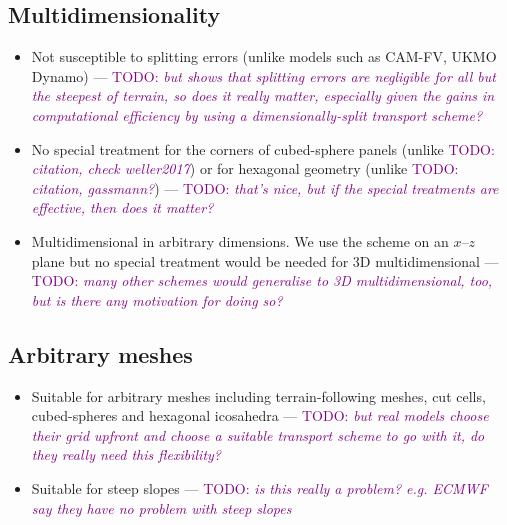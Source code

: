 \documentclass{article}
\newcommand{\TODO}[1]{\textcolor{purple}{TODO: \emph{#1}}}
\begin{document}
\subsection*{Multidimensionality}
\begin{itemize}
	\item Not susceptible to splitting errors (unlike models such as CAM-FV, UKMO Dynamo) --- \TODO{but \citep{weller2017} shows that splitting errors are negligible for all but the steepest of terrain, so does it really matter, especially given the gains in computational efficiency by using a dimensionally-split transport scheme?}
	\item No special treatment for the corners of cubed-sphere panels (unlike \TODO{citation, check weller2017}) or for hexagonal geometry (unlike \TODO{citation, gassmann?}) --- \TODO{that's nice, but if the special treatments are effective, then does it matter?}
	\item Multidimensional in arbitrary dimensions.  We use the scheme on an $x$--$z$ plane but no special treatment would be needed for 3D multidimensional --- \TODO{many other schemes would generalise to 3D multidimensional, too, but is there any motivation for doing so?}
\end{itemize}

\subsection*{Arbitrary meshes}
\begin{itemize}
	\item Suitable for arbitrary meshes including terrain-following meshes, cut cells, cubed-spheres and hexagonal icosahedra --- \TODO{but real models choose their grid upfront and choose a suitable transport scheme to go with it, do they really need this flexibility?}
	\item Suitable for steep slopes --- \TODO{is this really a problem?  e.g. ECMWF say they have no problem with steep slopes}
\end{itemize}
\end{document}
